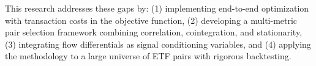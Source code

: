 \documentclass[12pt]{article}
\begin{document}
This research addresses these gaps by: (1) implementing end-to-end optimization with transaction costs in the objective function, (2) developing a multi-metric pair selection framework combining correlation, cointegration, and stationarity, (3) integrating flow differentials as signal conditioning variables, and (4) applying the methodology to a large universe of ETF pairs with rigorous backtesting.



\end{document}
